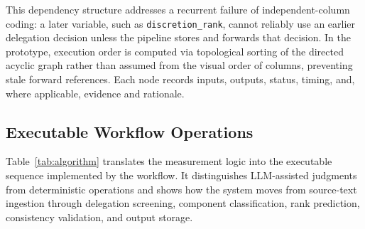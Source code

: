 \documentclass[runningheads]{llncs}
\begin{document}
This dependency structure addresses a recurrent failure of independent-column coding: a later variable, such as \texttt{discretion\_rank}, cannot reliably use an earlier delegation decision unless the pipeline stores and forwards that decision. In the prototype, execution order is computed via topological sorting of the directed acyclic graph rather than assumed from the visual order of columns, preventing stale forward references. Each node records inputs, outputs, status, timing, and, where applicable, evidence and rationale.

\vspace{-0.5 cm}

\subsection{Executable Workflow Operations}

Table~\ref{tab:algorithm} translates the measurement logic into the executable sequence implemented by the workflow. It distinguishes LLM-assisted judgments from deterministic operations and shows how the system moves from source-text ingestion through delegation screening, component classification, rank prediction, consistency validation, and output storage.
\end{document}
